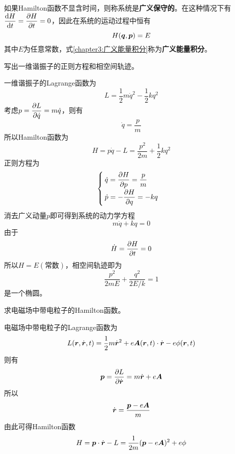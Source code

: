 如果Hamilton函数不显含时间，则称系统是{\bf 广义保守的}。在这种情况下有$\displaystyle \frac{\mathrm{d} H}{\mathrm{d} t} = \frac{\partial H}{\partial t} = 0$，因此在系统的运动过程中恒有
\begin{equation}
	H(\boldsymbol{q},\boldsymbol{p}) = E
	\label{chapter3:广义能量积分}
\end{equation}
其中$E$为任意常数，式\eqref{chapter3:广义能量积分}称为{\bf 广义能量积分}。

\begin{example}[一维谐振子]
写出一维谐振子的正则方程和相空间轨迹。
\end{example}
\begin{solution}
一维谐振子的Lagrange函数为
\begin{equation*}
	L = \frac12 m\dot{q}^2 - \frac12 kq^2
\end{equation*}
考虑$p = \dfrac{\partial L}{\partial \dot{q}} = m\dot{q}$，则有
\begin{equation*}
	\dot{q} = \frac{p}{m}
\end{equation*}
所以Hamilton函数为
\begin{equation*}
	H = p\dot{q} - L = \frac{p^2}{2m} + \frac12 kq^2
\end{equation*}
正则方程为
\begin{equation*}
	\begin{cases}
		\dot{q} = \dfrac{\partial H}{\partial p} = \dfrac{p}{m} \\[1.5ex]
		\dot{p} = -\dfrac{\partial H}{\partial q} = -kq
	\end{cases}
\end{equation*}
消去广义动量$p$即可得到系统的动力学方程
\begin{equation*}
	m\ddot{q} + kq = 0
\end{equation*}
由于
\begin{equation*}
	\dot{H} = \frac{\partial H}{\partial t} = 0
\end{equation*}
所以$H = E(\text{常数})$，相空间轨迹即为
\begin{equation*}
	\frac{p^2}{2mE} + \frac{q^2}{2E/k} = 1
\end{equation*}
是一个椭圆。
\end{solution}

\begin{example}[电磁场中带电粒子的Hamilton函数]
求电磁场中带电粒子的Hamilton函数。
\end{example}
\begin{solution}
电磁场中带电粒子的Lagrange函数为
\begin{equation*}
	L(\boldsymbol{r},\dot{\boldsymbol{r}},t) = \frac12 m \dot{\boldsymbol{r}}^2 + e\boldsymbol{A}(\boldsymbol{r},t) \cdot \dot{\boldsymbol{r}} - e\phi(\boldsymbol{r},t)
\end{equation*}
则有
\begin{equation*}
	\boldsymbol{p} = \frac{\partial L}{\partial \dot{\boldsymbol{r}}} = m\dot{\boldsymbol{r}} + e\boldsymbol{A}
\end{equation*}
所以
\begin{equation*}
	\dot{\boldsymbol{r}} = \frac{\boldsymbol{p} - e\boldsymbol{A}}{m}
\end{equation*}
由此可得Hamilton函数
\begin{equation*}
	H = \boldsymbol{p} \cdot \dot{\boldsymbol{r}} - L = \frac{1}{2m} (\boldsymbol{p}-e\boldsymbol{A})^2 + e\phi
\end{equation*}
\end{solution}

